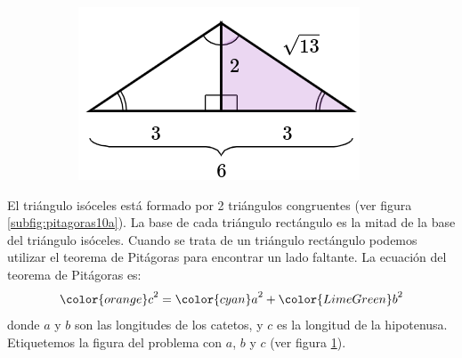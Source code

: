 \begin{solutionbox}{7cm}
\begin{figure}
\begin{subfigure}{0.9\linewidth}
            \caption{}
            \label{subfig:pitagoras10b}
        \end{subfigure}
        \begin{subfigure}{0.9\linewidth}
            \includegraphics[width=\linewidth]{../images/pitagoras10c.png}
            \caption{}
            \label{subfig:pitagoras10c}
        \end{subfigure}
        \caption{}
        \label{fig:pitagoras10}
    \end{figure}
    El triángulo isóceles está formado por 2 triángulos congruentes (ver figura \ref{subfig:pitagoras10a}).
    La base de cada triángulo rectángulo es la mitad de la base del triángulo isóceles.
    Cuando se trata de un triángulo rectángulo podemos utilizar el teorema de Pitágoras para encontrar un lado faltante.
    La ecuación del teorema de Pitágoras es:
    \[{\color{orange}c}^2={\color{cyan}a}^2+{\color{LimeGreen}b}^2\]
    donde $a$ y $b$ son las longitudes de los catetos, y $c$ es la longitud de la hipotenusa.
    Etiquetemos la figura del problema con $a$, $b$ y $c$ (ver figura \ref{subfig:pitagoras10b}).


\end{solutionbox}
